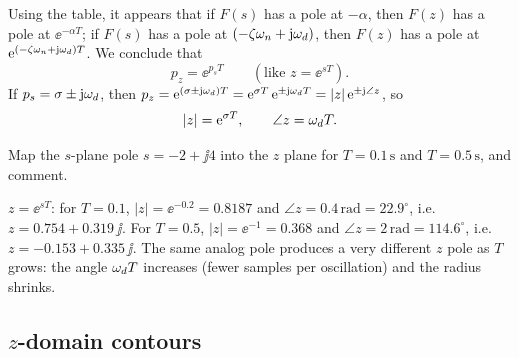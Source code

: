 \begin{center}
\end{center}
Using the table, it appears that if $F(s)$ has a pole at $-\alpha$, then $F(z)$ has a pole at $\ee^{-\alpha T}$;
if $F(s)$ has a pole at $(-\zeta\omega_n+\mathrm{j}\omega_d)$, then $F(z)$ has a pole at $\mathrm{e}^{(-\zeta\omega_n+\mathrm{j}\omega_d)T}$.
We conclude that
\begin{equation}
  p_z=\ee^{p_sT}\qquad(\text{like }z=\ee^{sT}).
\end{equation}
If $p_s=\sigma\pm\mathrm{j}\omega_d$, then $p_z=\mathrm{e}^{(\sigma\pm\mathrm{j}\omega_d)T}=\mathrm{e}^{\sigma T}\,\mathrm{e}^{\pm\mathrm{j}\omega_d T}=|z|\,\mathrm{e}^{\pm\mathrm{j}\angle z}$, so
\begin{equation}
  |z|=\mathrm{e}^{\sigma T},\qquad \angle z=\omega_d T.
\end{equation}

\begin{problem}
Map the $s$-plane pole $s=-2+\jj4$ into the $z$ plane for $T=0.1\,\mathrm{s}$ and $T=0.5\,\mathrm{s}$, and
comment.
\end{problem}
\begin{solution}
$z=\ee^{sT}$: for $T=0.1$, $|z|=\ee^{-0.2}=0.8187$ and $\angle z=0.4\,\mathrm{rad}=22.9^{\circ}$, i.e.\
$z=0.754+0.319\,\jj$. For $T=0.5$, $|z|=\ee^{-1}=0.368$ and $\angle z=2\,\mathrm{rad}=114.6^{\circ}$, i.e.\
$z=-0.153+0.335\,\jj$. The same analog pole produces a very different $z$ pole as $T$ grows: the angle
$\omega_d T$ increases (fewer samples per oscillation) and the radius shrinks.
\end{solution}

\subsection{$z$-domain contours}
